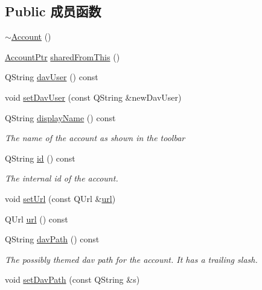 \subsection*{Public 成员函数}
\begin{DoxyCompactItemize}
\item 
\hyperlink{class_o_c_c_1_1_account_ad2185f0518cf08d14c612083ab5d6731}{$\sim$\+Account} ()
\item 
\hyperlink{namespace_o_c_c_a848616aedb9188e223c6b9867757fe69}{Account\+Ptr} \hyperlink{class_o_c_c_1_1_account_a64e841a6e5d55baafd9c828c20628fbb}{shared\+From\+This} ()
\item 
Q\+String \hyperlink{class_o_c_c_1_1_account_ad2b36362bb8cb4c202b5cb13714fc123}{dav\+User} () const
\item 
void \hyperlink{class_o_c_c_1_1_account_a1c71c18b883065c1ccba6ab8a2c1c8e9}{set\+Dav\+User} (const Q\+String \&new\+Dav\+User)
\item 
Q\+String \hyperlink{class_o_c_c_1_1_account_abad900771de98bbb53fc935774787d4b}{display\+Name} () const
\begin{DoxyCompactList}\small\item\em The name of the account as shown in the toolbar \end{DoxyCompactList}\item 
Q\+String \hyperlink{class_o_c_c_1_1_account_a14c815f39fec803bf76c3a6b8fd97a7d}{id} () const
\begin{DoxyCompactList}\small\item\em The internal id of the account. \end{DoxyCompactList}\item 
void \hyperlink{class_o_c_c_1_1_account_ae390d247463832a8b8b129e16dab32b9}{set\+Url} (const Q\+Url \&\hyperlink{class_o_c_c_1_1_account_a8aa1b92581de450a356a51ad8760d1f1}{url})
\item 
Q\+Url \hyperlink{class_o_c_c_1_1_account_a8aa1b92581de450a356a51ad8760d1f1}{url} () const
\item 
Q\+String \hyperlink{class_o_c_c_1_1_account_a75a7f141d4bb9bf9034318c440e419c8}{dav\+Path} () const
\begin{DoxyCompactList}\small\item\em The possibly themed dav path for the account. It has a trailing slash. \end{DoxyCompactList}\item 
void \hyperlink{class_o_c_c_1_1_account_af4fbf2933bec589bdf430532955b33fb}{set\+Dav\+Path} (const Q\+String \&s)
\item 

\end{DoxyCompactItemize}
